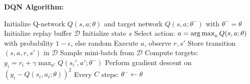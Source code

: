 \begin{seanbox}{5.7}
\textbf{DQN Algorithm:}

\begin{algorithmic}[1]
\State Initialize Q-network $Q(s, a; \theta)$ and target network $Q(s, a; \theta^-)$ with $\theta^- = \theta$
\State Initialize replay buffer $\mathcal{D}$
    \State Initialize state $s$
        \State Select action: $a = \operatorname*{arg\,max}_a Q(s, a; \theta)$ with probability $1-\epsilon$, else random
        \State Execute $a$, observe $r, s'$
        \State Store transition $(s, a, r, s')$ in $\mathcal{D}$
        \State Sample mini-batch from $\mathcal{D}$
        \State Compute targets: $y_i = r_i + \gamma \max_{a'} Q(s_i', a'; \theta^-)$
        \State Perform gradient descent on $(y_i - Q(s_i, a_i; \theta))^2$
        \State Every $C$ steps: $\theta^- \leftarrow \theta$
    \EndFor
\EndFor
\end{algorithmic}
\end{seanbox}

